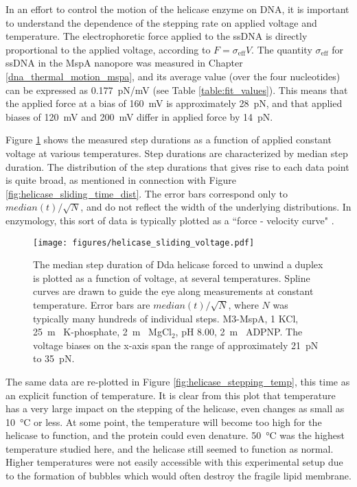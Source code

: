 In an effort to control the motion of the helicase enzyme on DNA, it is important to understand the dependence of the stepping rate on applied voltage and temperature.  The electrophoretic force applied to the ssDNA is directly proportional to the applied voltage, according to $F = \sigma_{\text{eff}} V$.  The quantity $\sigma_{\text{eff}}$ for ssDNA in the MspA nanopore was measured in Chapter \ref{dna_thermal_motion_mspa}, and its average value (over the four nucleotides) can be expressed as \SI{0.177}{\pico\N / \mV} (see Table \ref{table:fit_values}).  This means that the applied force at a bias of \SI{160}{\mV} is approximately \SI{28}{\pico\N}, and that applied biases of \SI{120}{\mV} and \SI{200}{\mV} differ in applied force by \SI{14}{\pico\N}.

Figure \ref{fig:helicase_stepping_voltage} shows the measured step durations as a function of applied constant voltage at various temperatures.  Step durations are characterized by median step duration.  The distribution of the step durations that gives rise to each data point is quite broad, as mentioned in connection with Figure \ref{fig:helicase_sliding_time_dist}.  The error bars correspond only to $median(t)/\sqrt{N}$, and do not reflect the width of the underlying distributions.  In enzymology, this sort of data is typically plotted as a ``force - velocity curve" \citep{Bustamante2004}.

\begin{figure}[h]
\begin{centering}
\texttt{[image: figures/helicase\_sliding\_voltage.pdf]}
\caption[Forced helicase stepping depends on voltage]{The median step duration of Dda helicase forced to unwind a duplex is plotted as a function of voltage, at several temperatures.  Spline curves are drawn to guide the eye along measurements at constant temperature.  Error bars are $median(t)/\sqrt{N}$, where $N$ was typically many hundreds of individual steps.  M3-MspA, \SI{1}{\Molar} KCl, \SI{25}{\m\Molar} K-phosphate, \SI{2}{\m\Molar} MgCl$_2$, pH \num{8.00}, \SI{2}{\m\Molar} ADPNP.  The voltage biases on the x-axis span the range of approximately \SI{21}{\pico\N} to \SI{35}{\pico\N}.}
\label{fig:helicase_stepping_voltage}
\end{centering}
\end{figure}

The same data are re-plotted in Figure \ref{fig:helicase_stepping_temp}, this time as an explicit function of temperature.  It is clear from this plot that temperature has a very large impact on the stepping of the helicase, even changes as small as \SI{10}{\celsius} or less.  At some point, the temperature will become too high for the helicase to function, and the protein could even denature.  \SI{50}{\celsius} was the highest temperature studied here, and the helicase still seemed to function as normal.  Higher temperatures were not easily accessible with this experimental setup due to the formation of bubbles which would often destroy the fragile lipid membrane.

